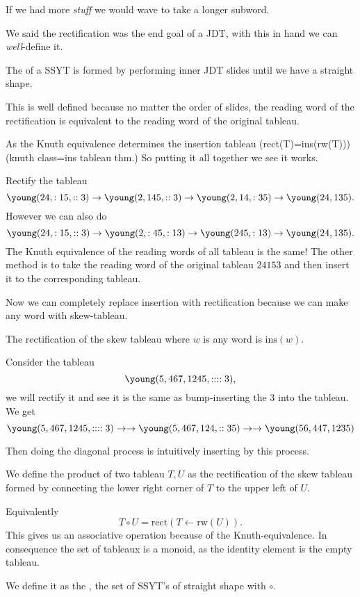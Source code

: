 \documentclass[12pt]{memoir}
\begin{document}
\begin{Rmk}
    If we had more \emph{stuff} we would wave to take a longer subword.
\end{Rmk}

We said the rectification was the end goal of a JDT, with this in hand we can \emph{well}-define it. 

\begin{Def}
    The  of a SSYT is formed by performing inner JDT slides until we have a straight shape. 
\end{Def}

This is well defined because no matter the order of slides, the reading word of the rectification is equivalent to the reading word of the original tableau.\par 
As the Knuth equivalence determines the insertion tableau (rect(T)=ins(rw(T))) (knuth class=ins tableau thm.) So putting it all together we see it works.

\begin{Ex}
    Rectify the tableau 
    $$\young(24,:15,::3)\to\young(2,145,::3)\to\young(2,14,:35)\to\young(24,135).$$
    However we can also do 
    $$\young(24,:15,::3)\to\young(2,:45,:13)\to\young(245,:13)\to\young(24,135).$$
    The Knuth equivalence of the reading words of all tableau is the same! The other method is to take the reading word of the original tableau $24153$ and then insert it to the corresponding tableau.
\end{Ex}

Now we can completely replace insertion with rectification because we can make any word with skew-tableau.

\begin{Cor}
    The rectification of the skew tableau
    where $w$ is any word is $\text{ins}(w)$.
\end{Cor}

\begin{Ex}
    Consider the tableau 
    $$\young(5,467,1245,::::3),$$
    we will rectify it and see it is the same as bump-inserting the $3$ into the tableau.
    We get 
    $$\young(5,467,1245,::::3)\to\to\young(5,467,124,::35)\to\to\young(56,447,1235)$$
\end{Ex}

Then doing the diagonal process is intuitively inserting by this process.

\begin{Def}
    We define the product of two tableau $T,U$ as the rectification of the skew tableau formed by connecting the lower right corner of $T$ to the upper left of $U$.\par 
    Equivalently
    $$T\circ U=\text{rect}(T\leftarrow\text{rw}(U)).$$
    This gives us an associative operation because of the Knuth-equivalence. In consequence the set of tableaux is a monoid, as the identity element is the empty tableau.\par 
    We define it as the , the set of SSYT's of straight shape with $\circ$. 
\end{Def}
\end{document}
